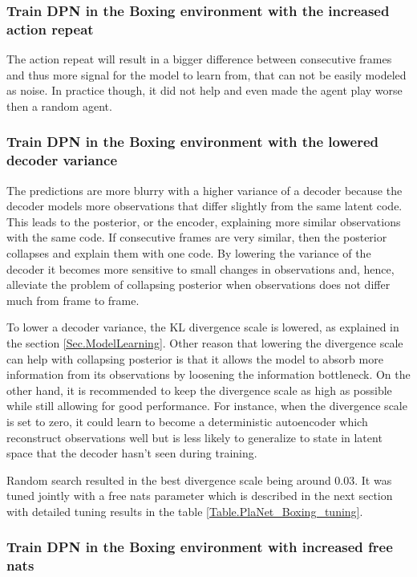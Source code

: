 \subsubsection{Train DPN in the Boxing environment with the increased action repeat}

The action repeat will result in a bigger difference between consecutive frames and thus more signal for the model to learn from, that can not be easily modeled as noise. In practice though, it did not help and even made the agent play worse then a random agent.

\subsubsection{Train DPN in the Boxing environment with the lowered decoder variance}

The predictions are more blurry with a higher variance of a decoder because the decoder models more observations that differ slightly from the same latent code. This leads to the posterior, or the encoder, explaining more similar observations with the same code. If consecutive frames are very similar, then the posterior collapses and explain them with one code. By lowering the variance of the decoder it becomes more sensitive to small changes in observations and, hence, alleviate the problem of collapsing posterior when observations does not differ much from frame to frame.

To lower a decoder variance, the KL divergence scale is lowered, as explained in the section \ref{Sec.ModelLearning}. Other reason that lowering the divergence scale can help with collapsing posterior is that it allows the model to absorb more information from its observations by loosening the information bottleneck. On the other hand, it is recommended to keep the divergence scale as high as possible while still allowing for good performance. For instance, when the divergence scale is set to zero, it could learn to become a deterministic autoencoder which reconstruct observations well but is less likely to generalize to state in latent space that the decoder hasn't seen during training.

Random search resulted in the best divergence scale being around 0.03. It was tuned jointly with a free nats parameter which is described in the next section with detailed tuning results in the table \ref{Table.PlaNet_Boxing_tuning}.

\subsubsection{Train DPN in the Boxing environment with increased free nats}

